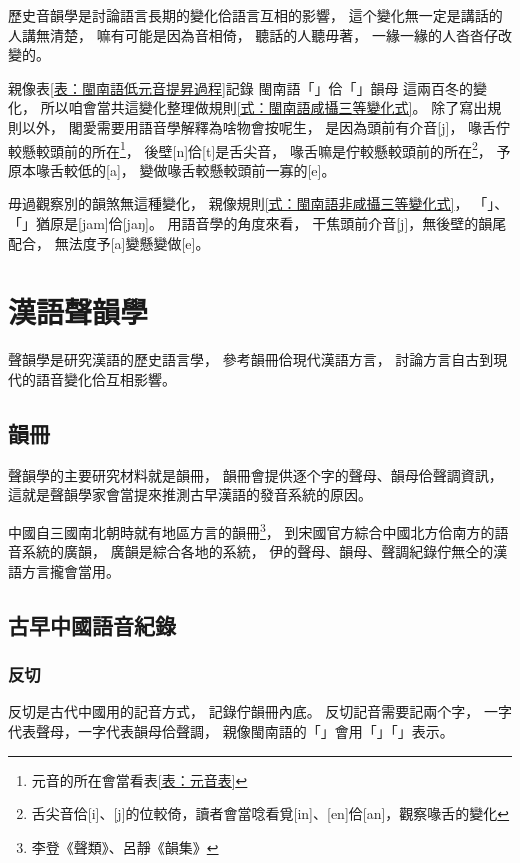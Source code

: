 歷史音韻學是討論語言長期的變化佮語言互相的影響，
這个變化無一定是講話的人講無清楚，
嘛有可能是因為音相倚，
聽話的人聽毋著，
一緣一緣的人沓沓仔改變的。

親像表\ref{表：閩南語低元音提昇過程}記錄
閩南語「」佮「」韻母
這兩百冬的變化，
所以咱會當共這變化整理做規則\ref{式：閩南語咸攝三等變化式}。
除了寫出規則以外，
閣愛需要用語音學解釋為啥物會按呢生，
是因為頭前有介音[j]，
喙舌佇較懸較頭前的所在\footnote{元音的所在會當看表\ref{表：元音表}}，
後壁[n]佮[t]是舌尖音，
喙舌嘛是佇較懸較頭前的所在\footnote{舌尖音佮[i]、[j]的位較倚，讀者會當唸看覓[in]、[en]佮[an]，觀察喙舌的變化}，
予原本喙舌較低的[a]，
變做喙舌較懸較頭前一寡的[e]。

毋過觀察別的韻煞無這種變化，
親像規則\ref{式：閩南語非咸攝三等變化式}，
「」、「」猶原是[jam]佮[jaŋ]。
用語音學的角度來看，
干焦頭前介音[j]，無後壁的韻尾配合，
無法度予[a]變懸變做[e]。


\section{漢語聲韻學}
\label{節：漢語聲韻學}
聲韻學是研究漢語的歷史語言學，
參考韻冊佮現代漢語方言，
討論方言自古到現代的語音變化佮互相影響。

\subsection{韻冊}
\label{小節：韻冊}

聲韻學的主要研究材料就是韻冊，
韻冊會提供逐个字的聲母、韻母佮聲調資訊，
這就是聲韻學家會當提來推測古早漢語的發音系統的原因。

中國自三國南北朝時就有地區方言的韻冊\footnote{李登《聲類》、呂靜《韻集》}，
到宋國官方綜合中國北方佮南方的語音系統的廣韻\cite{2002廣韻注漳州漢音}\cite{2010新校互註宋本廣韻}，
廣韻是綜合各地的系統，
伊的聲母、韻母、聲調紀錄佇無仝的漢語方言攏會當用。

\subsection{古早中國語音紀錄}
\label{小節：古早中國語音紀錄}

\subsubsection{反切}
\label{小節：反切}

反切是古代中國用的記音方式，
記錄佇韻冊內底。
反切記音需要記兩个字，
一字代表聲母，一字代表韻母佮聲調，
親像閩南語的「」會用「」「」表示。%

